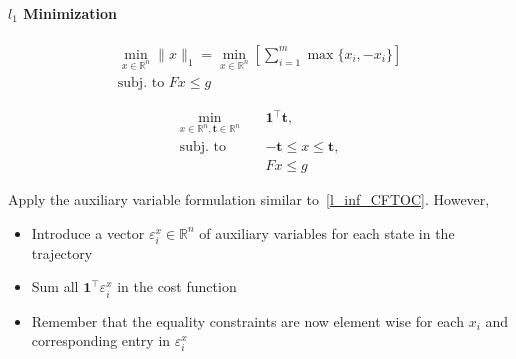 \paragraph[l1 Minimization]{$l_{1}$ Minimization}
\noindent
\begin{gather*}
    \min_{x \in \mathbb{R}^n} \|x\|_1 = \min_{x \in \mathbb{R}^n} \left[ \sum_{i=1}^{m} \max \{x_i, -x_i\} \right] \\
    \text{subj.\ to } Fx \leq g
\end{gather*}

\noindent
\begin{align*}
    \min_{x \in \mathbb{R}^n, \mathbf{t} \in \mathbb{R}^n}\quad & \mathbf{1}^\top \mathbf{t},         \\
    \text{subj.\ to }\quad                                      & -\mathbf{t} \leq x \leq \mathbf{t}, \\
                                                                & Fx \leq g
\end{align*}

Apply the auxiliary variable formulation similar to~\ref{l_inf_CFTOC}. However,
\begin{itemize}
    \item Introduce a vector $\varepsilon_i^x \in \mathbb{R}^n$ of auxiliary variables for each state in the trajectory
    \item Sum all $\mathbf{1}^\top \varepsilon_i^x$ in the cost function
    \item Remember that the equality constraints are now element wise for each $x_i$ and corresponding entry in $\varepsilon_i^x$
\end{itemize}

